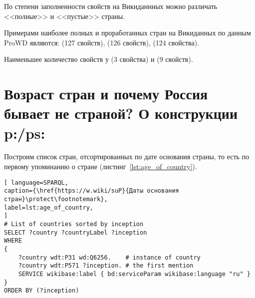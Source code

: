 По степени заполненности свойств на Викиданнных можно различать <<полные>> и  <<пустые>> страны. 

Примерами наиболее полных и проработанных стран на Викиданных по данным ProWD\cite{prowd_balakireva} являются:  (127 свойств),  (126 свойств),  (124 свойства).

Наименьшее количество свойств у  (3 свойства) и  (9 свойств).

\section{Возраст стран и почему Россия бывает не страной? О конструкции p:/ps:}
\label{ch:RussiaNotCountryPPS}



Построим список стран, отсортированных по дате основания страны, то есть по первому упоминанию о стране (листинг~\ref{lst:age_of_country}).

\begin{lstlisting}[ language=SPARQL, 
caption={\href{https://w.wiki/suP}{Даты основания стран}\protect\footnotemark},
label=lst:age_of_country, 
]
# List of countries sorted by inception 
SELECT ?country ?countryLabel ?inception
WHERE
{
	?country wdt:P31 wd:Q6256.    # instance of country
	?country wdt:P571 ?inception. # the first mention
	SERVICE wikibase:label { bd:serviceParam wikibase:language "ru" }
}
ORDER BY (?inception)
\end{lstlisting}

